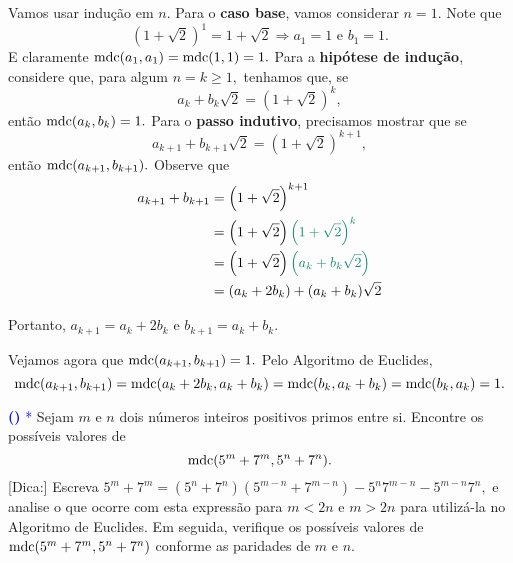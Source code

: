 \documentclass[12pt, a4paper]{article}
\newcommand{\mdc}{{\rm mdc}}
\newcounter{exercicio}[section]
\newenvironment{exercicio}[1][]{\refstepcounter{exercicio}\par\medskip
 \textcolor{blue}{\bf(\theexercicio)} \rmfamily}{\medskip }
\begin{document}
\begin{solution}
Vamos usar indução em $n.$ Para o \textbf{caso base},  vamos considerar $n = 1.$ Note que 
\[
\left(1 + \sqrt{2} \right)^1 = 1 + \sqrt{2} \Rightarrow a_1 = 1 \mbox{ e } b_1 = 1.
\]
E claramente $\mdc(a_1, a_1) = \mdc(1,1) = 1.$
Para a \textbf{hipótese de indução}, considere que, para algum $n = k \ge 1,$ tenhamos que, se
\[
a_k + b_k \sqrt{2} = \left( 1 + \sqrt{2} \right)^k,
\]
então $\mdc(a_k,b_k) = 1.$
Para o \textbf{passo indutivo}, precisamos mostrar que se 
\[
a_{k+1} + b_{k+1} \sqrt{2} = \left( 1 + \sqrt{2} \right)^{k+1},
\]
então $\mdc(a_{k+1}, b_{k+1}).$
Observe que
\begin{align*}
    a_{k+1} + b_{k+1} &= \left( 1 + \sqrt{2} \right)^{k+1}
    \\&= \left( 1 + \sqrt{2} \right) \textcolor{PineGreen}{\left( 1 + \sqrt{2} \right)^{k}}
    \\&= \left( 1 + \sqrt{2} \right) \textcolor{PineGreen}{\left( a_k + b_k \sqrt{2} \right)} 
    \\&= (a_k + 2b_k) + (a_k + b_k) \sqrt{2}
\end{align*}

Portanto, $a_{k+1} = a_k + 2b_k$ e $b_{k+1} = a_k + b_k.$

Vejamos agora que $\mdc(a_{k+1}, b_{k+1}) = 1.$ Pelo Algoritmo de Euclides,
\[
\mdc(a_{k+1}, b_{k+1}) = \mdc(a_k + 2b_k, a_k + b_k) = \mdc(b_k, a_k + b_k) = \mdc(b_k, a_k) = 1.
\]
\end{solution}
\begin{exercicio}\textcolor{Blue}{*}
Sejam $m$ e $n$ dois números inteiros positivos primos entre si. Encontre os possíveis valores de 
\[
\mdc(5^m + 7^m, 5^n + 7^n).
\]
\textsf{[Dica:]} Escreva $5^m + 7^m = (5^n + 7^n)(5^{m-n} + 7^{m-n}) - 5^n 7^{m-n} - 5^{m-n}7^n,$ e analise o que ocorre com esta expressão para $m <2n$ e $m > 2n$ para utilizá-la no Algoritmo de Euclides. Em seguida, verifique os possíveis valores de $\mdc(5^m + 7^m, 5^n + 7^n)$ conforme as paridades de $m$ e $n.$
\end{exercicio}
\end{document}
